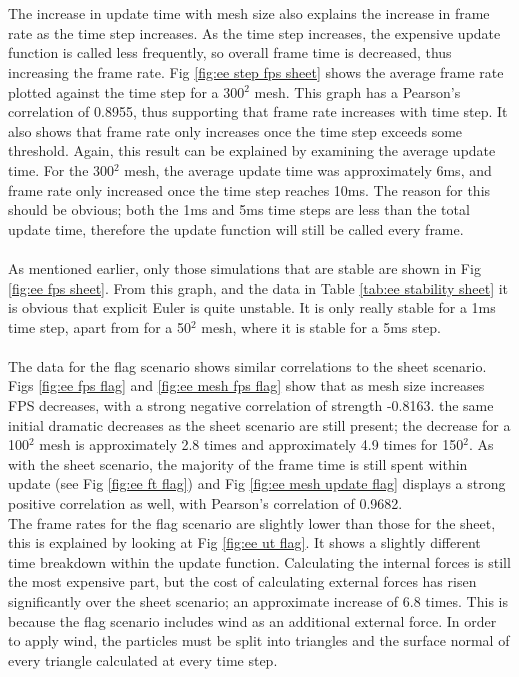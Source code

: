 \\\\The increase in update time with mesh size also explains the increase in frame rate as the time step increases. As the time step increases, the expensive update function is called less frequently, so overall frame time is decreased, thus increasing the frame rate. Fig \ref{fig:ee step fps sheet} shows the average frame rate plotted against the time step for a 300$^{2}$ mesh. This graph has a Pearson's correlation of 0.8955, thus supporting that frame rate increases with time step. It also shows that frame rate only increases once the time step exceeds some threshold. Again, this result can be explained by examining the average update time. For the 300$^{2}$ mesh, the average update time was approximately 6ms, and frame rate only increased once the time step reaches 10ms. The reason for this should be obvious; both the 1ms and 5ms time steps are less than the total update time, therefore the update function will still be called every frame.
\\\\As mentioned earlier, only those simulations that are stable are shown in Fig \ref{fig:ee fps sheet}. From this graph, and the data in Table \ref{tab:ee stability sheet} it is obvious that explicit Euler is quite unstable. It is only really stable for a 1ms time step, apart from for a 50$^{2}$ mesh, where it is stable for a 5ms step.
\\\\The data for the flag scenario shows similar correlations to the sheet scenario. Figs \ref{fig:ee fps flag} and \ref{fig:ee mesh fps flag} show that as mesh size increases FPS decreases, with a strong negative correlation of strength -0.8163. the same initial dramatic decreases as the sheet scenario are still present; the decrease for a 100$^{2}$ mesh is approximately 2.8 times and approximately 4.9 times for 150$^{2}$. As with the sheet scenario, the majority of the frame time is still spent within update (see Fig \ref{fig:ee ft flag}) and Fig \ref{fig:ee mesh update flag} displays a strong positive correlation as well, with Pearson's correlation of 0.9682.
\\The frame rates for the flag scenario are slightly lower than those for the sheet, this is explained by looking at Fig \ref{fig:ee ut flag}. It shows a slightly different time breakdown within the update function. Calculating the internal forces is still the most expensive part, but the cost of calculating external forces has risen significantly over the sheet scenario; an approximate increase of 6.8 times. This is because the flag scenario includes wind as an additional external force. In order to apply wind, the particles must be split into triangles and the surface normal of every triangle calculated at every time step. 
